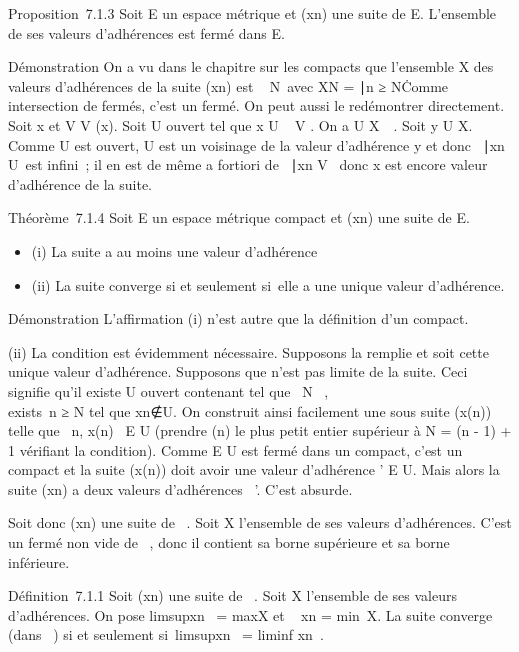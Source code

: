 Proposition~7.1.3 Soit E un espace métrique et (xn) une suite
de E. L'ensemble de ses valeurs d'adhérences est fermé dans E.

Démonstration On a vu dans le chapitre sur les compacts que l'ensemble X
des valeurs d'adhérences de la suite (xn) est
\⋂ ~
N\in{}~\overlineXN avec XN =
\xn∣n ≥
N\. Comme intersection de fermés, c'est un fermé. On
peut aussi le redémontrer directement. Soit x
\in\overlineX et V \in V (x). Soit U ouvert tel que x \in U
\subset~ V . On a U \bigcap X\neq~\varnothing~. Soit y \in U \bigcap X. Comme U
est ouvert, U est un voisinage de la valeur d'adhérence y et donc
\n \in {}~∣xn \in
U\ est infini~; il en est de même a fortiori de
\n \in {}~∣xn \in V
\, donc x est encore valeur d'adhérence de la suite.

Théorème~7.1.4 Soit E un espace métrique compact et (xn) une
suite de E.

\begin{itemize}
\itemsep1pt\parskip0pt
\item
  (i) La suite a au moins une valeur d'adhérence
\item
  (ii) La suite converge si et seulement si~elle a une unique valeur
  d'adhérence.
\end{itemize}

Démonstration L'affirmation (i) n'est autre que la définition d'un
compact.

(ii) La condition est évidemment nécessaire. Supposons la remplie et
soit \ell cette unique valeur d'adhérence. Supposons que \ell n'est pas limite
de la suite. Ceci signifie qu'il existe U ouvert contenant \ell tel que
\forall~N \in {}~, \\exists~n ≥ N tel
que xn∉U. On construit ainsi
facilement une sous suite (x\phi(n)) telle que
\forall~n, x\phi(n)~ \in E \diagdown U (prendre \phi(n) le
plus petit entier supérieur à N = \phi(n - 1) + 1 vérifiant la condition).
Comme E \diagdown U est fermé dans un compact, c'est un compact et la suite
(x\phi(n)) doit avoir une valeur d'adhérence \ell' \in E \diagdown U. Mais
alors la suite (xn) a deux valeurs d'adhérences
\ell\neq~\ell'. C'est absurde.

Soit donc (xn) une suite de \overline{}~.
Soit X l'ensemble de ses valeurs d'adhérences. C'est un fermé non vide
de \overline{}~, donc il contient sa borne supérieure
et sa borne inférieure.

Définition~7.1.1 Soit (xn) une suite de
\overline{}~. Soit X l'ensemble de ses valeurs
d'adhérences. On pose limsupxn~
= maxX et \liminf~
xn = min~X. La suite converge (dans
\overline{}~) si et seulement
si~limsupxn~
= liminf xn~.

